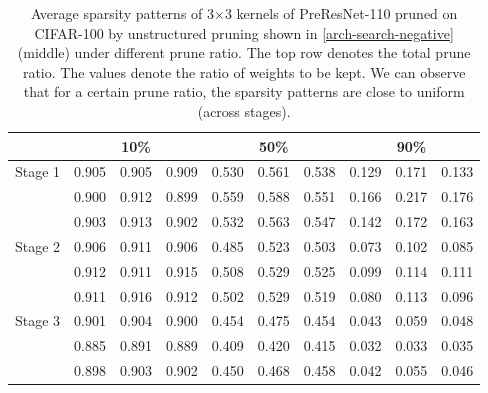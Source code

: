 \setlength{\tabcolsep}{5pt}
\renewcommand{\arraystretch}{1.2}
\begin{table}[!htbp]
\centering
\small
\begin{tabular}{c|ccc|ccc|ccc}
\hline
                         & \multicolumn{3}{c|}{10\%} & \multicolumn{3}{c|}{50\%} & \multicolumn{3}{c}{90\%} \\ \hline
\multirow{3}{*}{Stage 1} & 0.905   & 0.905  & 0.909  & 0.530   & 0.561  & 0.538  & 0.129  & 0.171  & 0.133  \\
                         & 0.900   & 0.912  & 0.899  & 0.559   & 0.588  & 0.551  & 0.166  & 0.217  & 0.176  \\
                         & 0.903   & 0.913  & 0.902  & 0.532   & 0.563  & 0.547  & 0.142  & 0.172  & 0.163  \\ \hline
\multirow{3}{*}{Stage 2} & 0.906   & 0.911  & 0.906  & 0.485   & 0.523  & 0.503  & 0.073  & 0.102  & 0.085  \\
                         & 0.912   & 0.911  & 0.915  & 0.508   & 0.529  & 0.525  & 0.099  & 0.114  & 0.111  \\
                         & 0.911   & 0.916  & 0.912  & 0.502   & 0.529  & 0.519  & 0.080  & 0.113  & 0.096  \\ \hline
\multirow{3}{*}{Stage 3} & 0.901   & 0.904  & 0.900  & 0.454   & 0.475  & 0.454  & 0.043  & 0.059  & 0.048  \\
                         & 0.885   & 0.891  & 0.889  & 0.409   & 0.420  & 0.415  & 0.032  & 0.033  & 0.035  \\
                         & 0.898   & 0.903  & 0.902  & 0.450   & 0.468  & 0.458  & 0.042  & 0.055  & 0.046  \\ \hline
\end{tabular}
  \caption{
      Average sparsity patterns of 3$\times$3 kernels of PreResNet-110 pruned on CIFAR-100 by unstructured pruning shown in \autoref{arch-search-negative} (middle) under different prune ratio. The top row denotes the total prune ratio. The values denote the ratio of weights to be kept. We can observe that for a certain prune ratio, the sparsity patterns are close to uniform (across stages).}
\label{sparsity-6}
\end{table}


